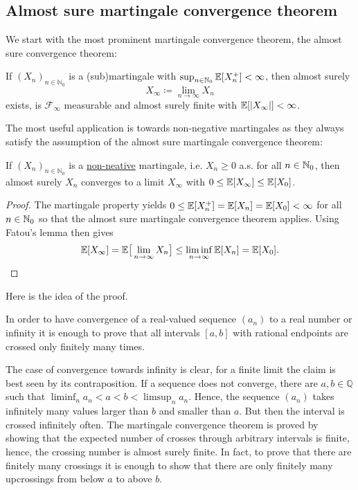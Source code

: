 \subsection{Almost sure martingale convergence theorem}
We start with the most prominent martingale convergence theorem, the almost sure convergence theorem:
\begin{lsuperwichtigersatz}
\begin{theorem}\label{as}
	If $(X_n)_{n\in\mathbb{N}_0}$ is a (sub)martingale with $\sup_{n\in\mathbb{N}_0}\mathbb{E}[X_n^+]<\infty$, then almost surely $$X_{\infty} \coloneqq \lim_{n\to \infty}X_n $$ exists, is $\mathcal F_\infty$ measurable and almost surely finite with $\mathbb{E}[\lvert X_{\infty}\rvert]<\infty$.
\end{theorem}
\end{lsuperwichtigersatz}
The most useful application is towards non-negative martingales as they always satisfy the assumption of the almost sure martingale convergence theorem:
\begin{lsatz}
\begin{corollary}\label{MMM}
	If $(X_n)_{n\in\mathbb{N}_0}$ is a \underline{non-neative} martingale, i.e. $X_n\geq 0$ a.s. for all $n\in\mathbb{N}_0$, then almost surely $X_n$ converges to a limit $X_{\infty}$ with $0\leq \mathbb{E}[X_{\infty}] \leq \mathbb{E}[X_0]$.
\end{corollary}
\end{lsatz}
\begin{proof}
 The martingale property yields $ 0\leq \mathbb{E}[X_n^+] = \mathbb{E}[X_n] = \mathbb{E}[X_0] < \infty$ for all $n\in\mathbb{N}_0$ so that the almost sure martingale convergence theorem applies. Using Fatou's lemma then gives $$\mathbb{E}[X_{\infty}] = \mathbb{E}\big[ \lim_{n\to\infty}X_n \big] \leq  \liminf_{n\to \infty} \mathbb{E}[X_n] = \mathbb{E}[X_0].$$
\end{proof}
Here is the idea of the proof. 
\begin{lstep}
In order to have convergence of a real-valued sequence $(a_n)$ to a real number or infinity it is enough to prove that all intervals $[a,b]$ with rational endpoints are crossed only finitely many times.
\end{lstep}
The case of convergence towards infinity is clear, for a finite limit the claim is best seen by its contraposition. If a sequence does not converge, there are $a,b\in\mathbb Q$ such that $\liminf_n a_n< a<b<\limsup_n a_n$. Hence, the sequence $(a_n)$ takes infinitely many values larger than $b$ and smaller than $a$. But then the interval is crossed infinitely often. The martingale convergence theorem is proved by showing that the expected number of crosses through arbitrary intervals is finite, hence, the crossing number is almost surely finite. In fact, to prove that there are finitely many crossings it is enough to show that there are only finitely many upcrossings from below $a$ to above $b$.
